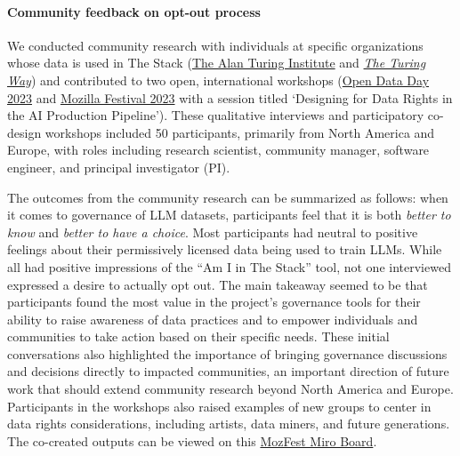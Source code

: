 \documentclass[10pt]{article} %
\begin{document}
\paragraph{Community feedback on opt-out process}
We conducted community research with individuals at specific organizations whose data is used in The Stack (\href{https://turing.ac.uk/}{The Alan Turing Institute} and \emph{\href{https://the-turing-way.netlify.app/}{The Turing Way}}) and contributed to two open, international workshops (\href{https://opendataday.org/events/2023/#designing-for-data-rights-in-the-ai-production-pipeline}{Open Data Day 2023} and \href{https://schedule.mozillafestival.org/session/KAS9YF-1}{Mozilla Festival 2023} with a session titled ‘Designing for Data Rights in the AI Production Pipeline’). 
These qualitative interviews and participatory co-design workshops included 50 participants, primarily from North America and Europe, with roles including research scientist, community manager, software engineer, and principal investigator (PI).

The outcomes from the community research can be summarized as follows: when it comes to governance of LLM datasets, participants feel that it is both \emph{better to know} and \emph{better to have a choice}. Most participants had neutral to positive feelings about their permissively licensed data being used to train LLMs. While all had positive impressions of the ``Am I in The Stack'' tool, not one interviewed expressed a desire to actually opt out. The main takeaway seemed to be that participants found the most value in the project's governance tools for their ability to raise awareness of data practices and to empower individuals and communities to take action based on their specific needs. These initial conversations also highlighted the importance of bringing governance discussions and decisions directly to impacted communities, an important direction of future work that should extend community research beyond North America and Europe. Participants in the workshops also raised examples of new groups to center in data rights considerations, including artists, data miners, and future generations. The co-created outputs can be viewed on this \href{https://github.com/bigcode-project/bigcode-analysis/blob/main/community_research/mozfest.pdf}{MozFest Miro Board}.




\end{document}
